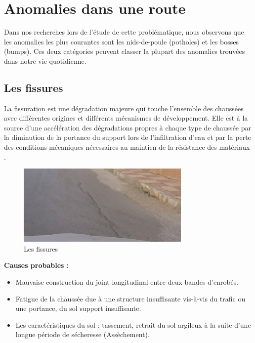 \section{Anomalies dans une route}
Dans nos recherches lors de l'étude de cette problématique, nous observons que les anomalies
les plus courantes sont les nids-de-poule (potholes) et les bosses (bumps).
Ces deux catégories peuvent classer la plupart des anomalies trouvées dans notre vie quotidienne.

\subsection{Les fissures}
La fissuration est une dégradation majeure qui touche l'ensemble des chaussées avec différentes origines et différents mécanismes de développement. Elle est à la source d'une accélération des dégradations propres à chaque type de chaussée par la diminution de la portance du support lors de l'infiltration d'eau et par la perte des conditions mécaniques nécessaires au maintien de la résistance des matériaux \cite{FissurationOrnierageProblematiques}.



\begin{figure}[h!]
  \center
  \includegraphics[width=0.75\textwidth]{Images/chapter1/fissures.jpg}
  \caption{Les fissures}
  \label{fig:Technologies}
\end{figure}


\textbf{Causes probables :}
\renewcommand{\labelitemi}{$\bullet$}
\begin{itemize}

  \item Mauvaise construction du joint longitudinal entre deux bandes d'enrobés.
  \item Fatigue de la chaussée due à une structure insuffisante vis-à-vis du trafic
        ou une portance, du sol support insuffisante.
  \item Les caractéristiques du sol : tassement, retrait du sol argileux à la suite
        d'une longue période de sécheresse (Assèchement).
\end{itemize}


